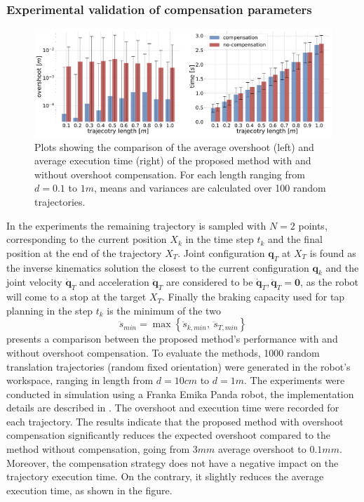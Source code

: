 \subsubsection*{Experimental validation of compensation parameters} 
\begin{figure}[!h]
    \centering
    \includegraphics[width=\linewidth]{Papers/imgs/compensation_comp.pdf}
    \caption{Plots showing the comparison of the average overshoot (left) and average execution time (right) of the proposed method with and without overshoot compensation. For each length ranging from $d=0.1$ to $1m$, means and variances are calculated over 100 random trajectories. }
    \label{fig:compensatiopn_comp}
\end{figure}
In the experiments the remaining trajectory is sampled with $N=2$ points, corresponding to the current position $X_k$ in the time step $t_k$ and the final position at the end of the trajectory $X_T$. Joint configuration $\bm{q}_T$ at $X_T$ is found as the inverse kinematics solution the closest to the current configuration $\bm{q}_k$ and the joint velocity $\dot{\bm{q}}_T$ and acceleration $\ddot{\bm{q}}_T$ are considered to be $\dot{\bm{q}}_T,\ddot{\bm{q}}_T= \bm{0}$, as the robot will come to a stop at the target $X_T$. Finally the braking capacity used for \gls{tap} planning in the step $t_k$ is the minimum of the two
\begin{equation}
    \ddot{s}_{min} = \max\left\{\ddot{s}_{k,min},~ \ddot{s}_{T,min}\right\}
\end{equation}
 presents a comparison between the proposed method's performance with and without overshoot compensation. To evaluate the methods, 1000 random translation trajectories (random fixed orientation) were generated in the robot's workspace, ranging in length from $d\!=\!10cm$ to $d\!=\!1m$. The experiments were conducted in simulation using a Franka Emika Panda robot, the implementation details are described in . The overshoot and execution time were recorded for each trajectory. The results indicate that the proposed method with overshoot compensation significantly reduces the expected overshoot compared to the method without compensation, going from $3mm$ average overshoot to $0.1mm$. Moreover, the compensation strategy does not have a negative impact on the trajectory execution time. On the contrary, it slightly reduces the average execution time, as shown in the figure.

